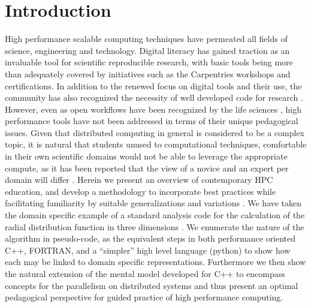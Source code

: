 \documentclass[conference]{IEEEtran}
\begin{document}
\section{Introduction}
High performance scalable computing techniques have permeated all fields of science, engineering and technology. Digital literacy has gained traction as an invaluable tool for scientific reproducible research, with basic tools being more than adequately covered by initiatives such as the Carpentries \cite{wilsonSoftwareCarpentryGetting2006a,tealDataCarpentryWorkshops2015} workshops and certifications. In addition to the renewed focus on digital tools and their use, the community has also recognized the necessity of well developed code for research \cite{gobleBetterSoftwareBetter2014}. However, even as open workflows have been recognized by the life sciences \cite{prlicTenSimpleRules2012,altschulAnatomySuccessfulComputational2013}, high performance tools have not been addressed in terms of their unique pedagogical issues. Given that distributed computing in general is considered to be a complex topic, it is natural that students unused to computational techniques, comfortable in their own scientific domains would not be able to leverage the appropriate compute, as it has been reported that the view of a novice and an expert per domain will differ \cite{chiNatureExpertise1988}. Herein we present an overview of contemporary HPC education, and develop a methodology to incorporate best practices while facilitating familiarity by suitable generalizations and variations \cite{catramboneGeneralizingSolutionProceduresa,braithwaiteEffectsVariationPrior2015}. We have taken the domain specific example of a standard analysis code for the calculation of the radial distribution function in three dimensions \cite{frenkelUnderstandingMolecularSimulation2001}. We enumerate the nature of the algorithm in pseudo-code, as the equivalent steps in both performance oriented C++, FORTRAN, and a ``simpler'' high level language (python) to show how each may be linked to domain specific representations. Furthermore we then show the natural extension of the mental model developed for C++ to encompass concepts for the parallelism on distributed systems and thus present an optimal pedagogical perspective for guided practice \cite{ericssonRoleDeliberatePractice} of high performance computing.
\end{document}
